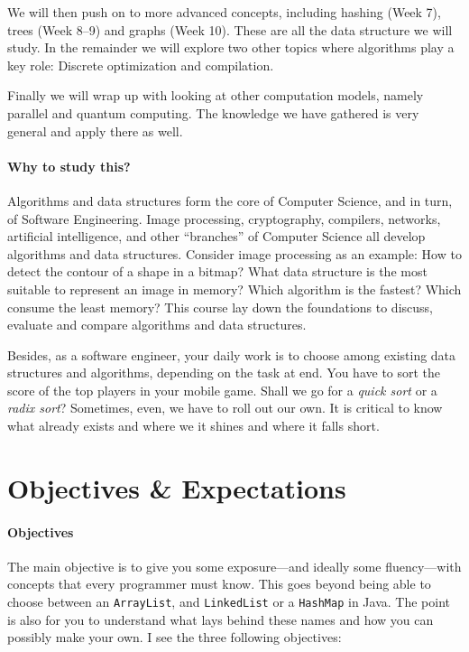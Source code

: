 \documentclass{aldast}
\begin{document}
We will then push on to more advanced concepts, including hashing
(Week 7), trees (Week 8--9) and graphs (Week 10). These are all the
data structure we will study. In the remainder we will explore two
other topics where algorithms play a key role: Discrete optimization
and compilation.

Finally we will wrap up with looking at other computation models,
namely parallel and quantum computing. The knowledge we have gathered
is very general and apply there as well.



\paragraph{Why to study this?} Algorithms and data structures form
the core of Computer Science, and in turn, of Software
Engineering. Image processing, cryptography, compilers, networks,
artificial intelligence, and other ``branches'' of Computer Science
all develop algorithms and data structures. Consider image processing as
an example: How to detect the contour of a shape in a bitmap?  What data
structure is the most suitable to represent an image in memory? Which
algorithm is the fastest? Which consume the least memory? This course
lay down the foundations to discuss, evaluate and compare algorithms
and data structures.

Besides, as a software engineer, your daily work is to choose among
existing data structures and algorithms, depending on the task at
end. You have to sort the score of the top players in your mobile
game. Shall we go for a \emph{quick sort} or a \emph{radix sort}?
Sometimes, even, we have to roll out our own. It is critical to know what
already exists and where we it shines and where it falls short.

\section{Objectives \& Expectations}

\paragraph{Objectives} The main objective is to give you some
exposure---and ideally some fluency---with concepts that every
programmer must know. This goes beyond being able to choose between an
\texttt{ArrayList}, and \texttt{LinkedList} or a \texttt{HashMap} in
Java. The point is also for you to understand what lays behind these
names and how you can possibly make your own. I see the three
following objectives:
\end{document}
